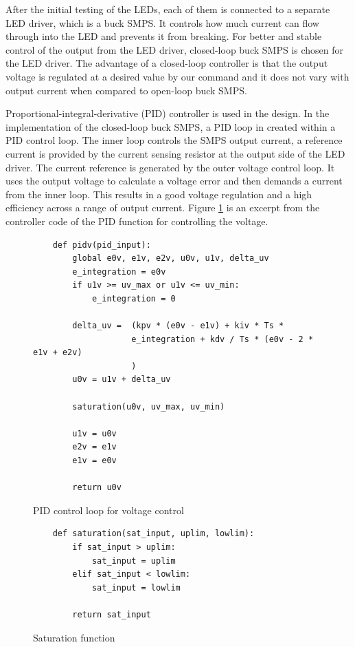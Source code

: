 After the initial testing of the LEDs, each of them is connected to a separate LED driver, which is a buck SMPS. It controls how much current can flow through into the LED and prevents it from breaking. For better and stable control of the output from the LED driver, closed-loop buck SMPS is chosen for the LED driver. The advantage of a closed-loop controller is that the output voltage is regulated at a desired value by our command and it does not vary with output current when compared to open-loop buck SMPS.

Proportional-integral-derivative (PID) controller is used in the design. In the implementation of the closed-loop buck SMPS, a PID loop in created within a PID control loop. The inner loop controls the SMPS output current, a reference current is provided by the current sensing resistor at the output side of the LED driver. The current reference is generated by the outer voltage control loop. It uses the output voltage to calculate a voltage error and then demands a current from the inner loop. This results in a good voltage regulation and a high efficiency across a range of output current. Figure \ref{code:pidv} is an excerpt from the controller code of the PID function for controlling the voltage.

\begin{figure}
    \footnotesize

    \begin{verbatim}
    def pidv(pid_input):
        global e0v, e1v, e2v, u0v, u1v, delta_uv
        e_integration = e0v
        if u1v >= uv_max or u1v <= uv_min:
            e_integration = 0

        delta_uv =  (kpv * (e0v - e1v) + kiv * Ts * 
                    e_integration + kdv / Ts * (e0v - 2 * e1v + e2v)
                    )  
        u0v = u1v + delta_uv

        saturation(u0v, uv_max, uv_min)

        u1v = u0v
        e2v = e1v
        e1v = e0v

        return u0v
    \end{verbatim}
    \caption{PID control loop for voltage control}
    \label{code:pidv}
\end{figure}

\begin{figure}
    \footnotesize
    \begin{verbatim}
    def saturation(sat_input, uplim, lowlim):
        if sat_input > uplim:
            sat_input = uplim
        elif sat_input < lowlim:
            sat_input = lowlim

        return sat_input
    \end{verbatim}
    \caption{Saturation function}
    \label{code:saturation}
\end{figure}

